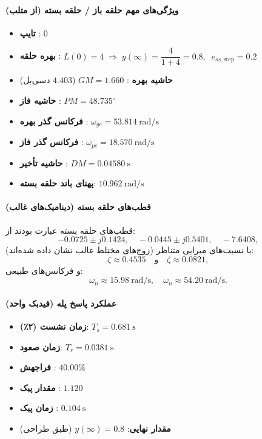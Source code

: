 \documentclass[a4paper]{article}
\begin{document}
\paragraph{ویژگی‌های مهم حلقه باز / حلقه بسته (از متلب)}
\begin{itemize}
	\item \textbf{تایپ }: $0$
	\item \textbf{بهره حلقه }: $L(0)=4 \;\Rightarrow\; y(\infty)=\dfrac{4}{1+4}=0.8,\;\; e_{ss,\text{step}}=0.2$
	\item \textbf{حاشیه بهره }: $GM=1.660$ ($4.403$ دسی‌بل)
	\item \textbf{حاشیه فاز }: $PM=48.735^\circ$
	\item \textbf{فرکانس گذر بهره }: $\omega_{gc}=53.814\ \text{rad/s}$
	\item \textbf{فرکانس گذر فاز }: $\omega_{pc}=18.570\ \text{rad/s}$
	\item \textbf{حاشیه تأخیر }: $DM=0.04580\ \text{s}$
	\item \textbf{پهنای باند حلقه بسته}: $10.962\ \text{rad/s}$
\end{itemize}

\paragraph{قطب‌های حلقه بسته (دینامیک‌های غالب)}
قطب‌های حلقه بسته عبارت بودند از:
\[
-0.0725\pm j0.1424,\quad
-0.0445\pm j0.5401,\quad
-7.6408,
\]
با نسبت‌های میرایی متناظر (زوج‌های مختلط غالب نشان داده شده‌اند):
\[
\zeta \approx 0.4535\quad \text{و}\quad \zeta \approx 0.0821,
\]
و فرکانس‌های طبیعی:
\[
\omega_n \approx 15.98\ \text{rad/s},\quad \omega_n \approx 54.20\ \text{rad/s}.
\]

\paragraph{عملکرد پاسخ پله (فیدبک واحد)}
\begin{itemize}
	\item \textbf{زمان نشست (۲٪)}: $T_s = 0.681\ \text{s}$
	\item \textbf{زمان صعود}: $T_r = 0.0381\ \text{s}$
	\item \textbf{فراجهش }: $40.00\%$
	\item \textbf{مقدار پیک }: $1.120$
	\item \textbf{زمان پیک }: $0.104\ \text{s}$
	\item \textbf{مقدار نهایی}: $y(\infty)=0.8$ (طبق طراحی)
	
\end{itemize}
\end{document}

